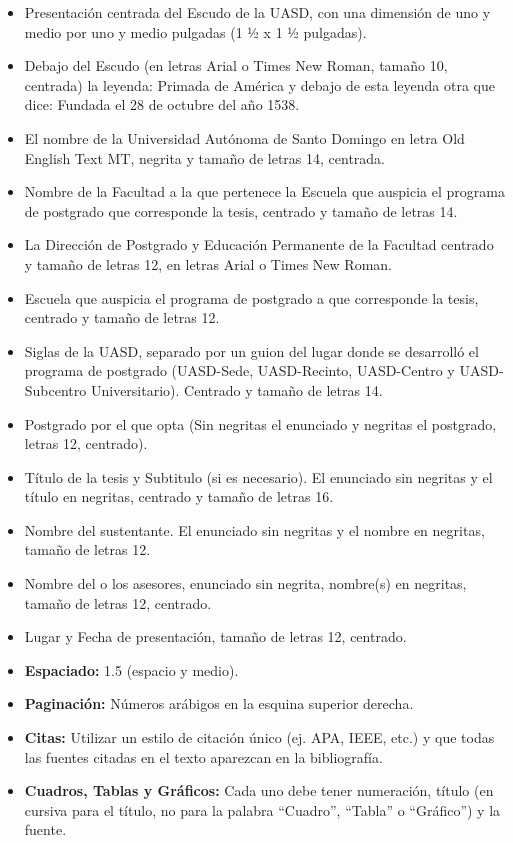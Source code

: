 \documentclass[12pt,a4paper]{article}
\begin{document}
\begin{itemize}
    \item Presentación centrada del Escudo de la UASD, con una dimensión de uno y medio por uno
    y medio pulgadas (1 ½ x 1 ½ pulgadas).
    
    \item Debajo del Escudo (en letras Arial o Times New Roman, tamaño 10, centrada) la leyenda:
Primada de América y debajo de esta leyenda otra que dice: Fundada el 28 de octubre del
año 1538.
\item El nombre de la Universidad Autónoma de Santo Domingo en letra Old English Text MT,
negrita y tamaño de letras 14, centrada.
\item Nombre de la Facultad a la que pertenece la Escuela que auspicia el programa de postgrado
 que corresponde la tesis, centrado y tamaño de letras 14.
 \item La Dirección de Postgrado y Educación Permanente de la Facultad centrado y tamaño de
letras 12, en letras Arial o Times New Roman.
\item Escuela que auspicia el programa de postgrado a que corresponde la tesis, centrado y
tamaño de letras 12.
\item Siglas de la UASD, separado por un guion del lugar donde se desarrolló el programa de
postgrado (UASD-Sede, UASD-Recinto, UASD-Centro y UASD-Subcentro
Universitario). Centrado y tamaño de letras 14.
\item Postgrado por el que opta (Sin negritas el enunciado y negritas el postgrado, letras 12,
centrado).
\item Título de la tesis y Subtitulo (si es necesario). El enunciado sin negritas y el título en
negritas, centrado y tamaño de letras 16.
\item Nombre del sustentante. El enunciado sin negritas y el nombre en negritas, tamaño de letras
12.
\item Nombre del o los asesores, enunciado sin negrita, nombre(s) en negritas, tamaño de letras
12, centrado.

\item Lugar y Fecha de presentación, tamaño de letras 12, centrado.

    \item \textbf{Espaciado:} 1.5 (espacio y medio).
    \item \textbf{Paginación:} Números arábigos en la esquina superior derecha.
    \item \textbf{Citas:} Utilizar un estilo de citación único (ej. APA, IEEE, etc.) y que todas las fuentes citadas en el texto aparezcan en la bibliografía.
    \item \textbf{Cuadros, Tablas y Gráficos:} Cada uno debe tener numeración, título (en cursiva para el título, no para la palabra “Cuadro”, “Tabla” o “Gráfico”) y la fuente.
\end{itemize}
\end{document}
